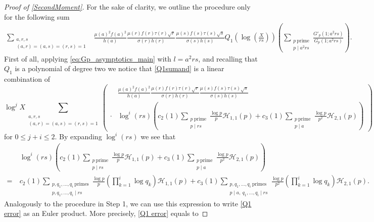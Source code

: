 \documentclass[10pt,a4paper]{amsart}
\def\CalH{{\mathcal{H}}}
\theoremstyle{plain}
\theoremstyle{definition}
\theoremstyle{remark}
\begin{document}
\begin{proof}[Proof of \cref{SecondMoment}]
For the sake of clarity, we outline the procedure only for the following sum 
\begin{align}\label{Q1sumand}
\sum_{\substack{a,r,s\\(a,r)=(a,s)=(r,s)=1}}
&\frac{\mu(a)^2f(a)^2}{h(a)}\frac{\mu(r)f(r)\tau(r)\sqrt{r}}{\sigma(r)h(r)}\frac{\mu(s)f(s)\tau(s)\sqrt{s}}{\sigma(s)h(s)}Q_1\left(\log\left(\frac{X}{rs}\right)\right)\left(\sum_{\substack{p \ \text{prime} \\ p\mid a^2rs}}\frac{G'_{p}(1;a^2rs)}{G_{p}(1;a^2rs)}\right).
\end{align}
First of all, applying \eqref{eq:Gp_asymptotics_main} with $l = a^2 r s$, and recalling that $Q_1$ is a polynomial of degree two we notice that \eqref{Q1sumand} is a linear combination of
\begin{equation}\label{Q1 error}
    \log^{j}X\sum_{\substack{a,r,s\\(a,r)=(a,s)=(r,s)=1}} \left( \begin{aligned}
&\frac{\mu(a)^2f(a)^2}{h(a)}\frac{\mu(r)f(r)\tau(r)\sqrt{r}}{\sigma(r)h(r)}\frac{\mu(s)f(s)\tau(s)\sqrt{s}}{\sigma(s)h(s)} \\ \cdot &\log^{i}(rs)\left(c_2(1) \sum_{\substack{p \ \text{prime} \\ p\mid rs}}\frac{\log p}{p}\CalH_{1,1}(p)+c_3(1)\sum_{\substack{p \ \text{prime} \\ p\mid a}}\frac{\log p}{p^2}\CalH_{2,1}(p)\right) \end{aligned} \right)
\end{equation}
for $0\leq j+i\leq 2$. By expanding $\log^{i}(rs)$ we see that
\begin{align*}
&\log^{i}(rs)\left(c_2(1) \sum_{\substack{p \ \text{prime} \\ p\mid rs}}\frac{\log p}{p}\CalH_{1,1}(p)+c_3(1) \sum_{\substack{p \ \text{prime} \\ p\mid a}}\frac{\log p}{p^2}\CalH_{2,1}(p)\right) \\ = \ &c_2(1) \sum_{\substack{p,q_1,\dots,q_i \ \text{primes} \\ p,q_1,\dots,q_i\mid rs}} \frac{\log p}{p} \left( \prod_{k=1}^i \log q_k \right) \CalH_{1,1}(p)+ c_3(1) \sum_{\substack{p,q_1,\dots,q_i \ \text{primes} \\ p\mid a, \ q_1,\dots,q_i\mid rs}}\frac{\log p}{p^2} \left( \prod_{k=1}^i \log q_k \right) \CalH_{2,1}(p).
\end{align*}
Analogously to the procedure in Step 1, we can use this expression to write \eqref{Q1 error} as an Euler product. More precisely, \eqref{Q1 error} equals to 

\end{proof}
\end{document}
